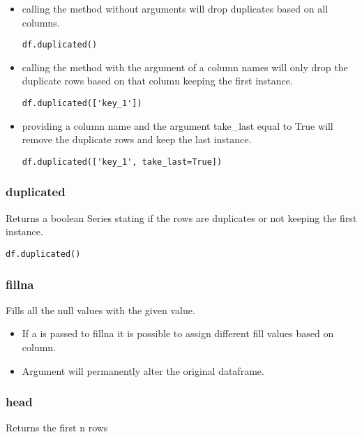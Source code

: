   \begin{itemize}
    \item calling the method without arguments will drop duplicates based on
      all columns.
\begin{lstlisting}
df.duplicated()
\end{lstlisting}
    \item calling the method with the argument of a column names will only drop
      the duplicate rows based on that column keeping the first instance.
\begin{lstlisting}
df.duplicated(['key_1'])
\end{lstlisting}
  \item providing a column name and the argument take\_last equal to True will
    remove the duplicate rows and keep the last instance.
\begin{lstlisting}
df.duplicated(['key_1', take_last=True])
\end{lstlisting}
  \end{itemize}

%
\subsubsection{duplicated}
Returns a boolean Series stating if the rows are duplicates or not keeping the
first instance.

\begin{lstlisting}
df.duplicated()
\end{lstlisting}

%
\subsubsection{fillna}
Fills all the null values with the given value.
  \begin{itemize}

    \item If a {\color{red}{dictionary}} is passed to fillna it is possible
      to assign different fill values based on column.

    \item Argument {\color{red}{inplace=True}} will permanently alter the
      original dataframe.
  \end{itemize}

%
\subsubsection{head}
Returns the first n rows


